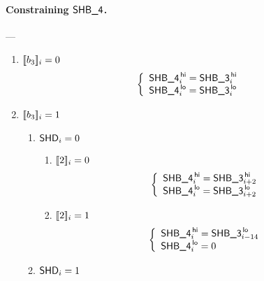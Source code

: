 \iffalse
\paragraph{Constraining $\textsf{SHB\_4}$.} ---
\begin{enumerate}
	\item \If $[\![b_3]\!]_{i} = 0$ \Then	
	\[
	\left\{
	\begin{array}{l}
		\textsf{SHB\_4}^{\mathsf{\,hi}}_{i} = \textsf{SHB\_3}^{\mathsf{\,hi}}_{i} \\
		\textsf{SHB\_4}^{\mathsf{\,lo}}_{i}  = \textsf{SHB\_3}^{\mathsf{\,lo}}_{i}  \\
	\end{array}
	\right.
	\]
	\item \If $[\![b_3]\!]_{i} = 1$ \Then
	\begin{enumerate}
		\item \If $\textsf{SHD}_{i} = 0$ \Then
		\begin{enumerate}
			\item \If $[\![2]\!]_{i} = 0$ \Then
			\[
			\left\{
			\begin{array}{l}
				\textsf{SHB\_4}^{\mathsf{\,hi}}_{i} = \textsf{SHB\_3}^{\mathsf{\,hi}}_{i + 2} \\
				\textsf{SHB\_4}^{\mathsf{\,lo}}_{i}  = \textsf{SHB\_3}^{\mathsf{\,lo}}_{i + 2}  \\
			\end{array}
			\right.
			\]
			\item \If $[\![2]\!]_{i} = 1$ \Then 
			\[
			\left\{
			\begin{array}{l}
				\textsf{SHB\_4}^{\mathsf{\,hi}}_{i} = \textsf{SHB\_3}^{\mathsf{\,lo}}_{i - 14} \\
				\textsf{SHB\_4}^{\mathsf{\,lo}}_{i}  = 0  \\
			\end{array}
			\right.
			\]
		\end{enumerate}
		\item \If $\textsf{SHD}_{i} = 1$ \Then

\end{enumerate}
\end{enumerate}

